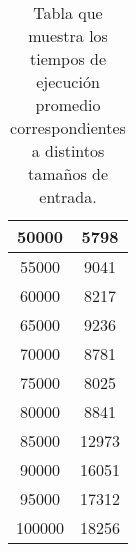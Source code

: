 \begin{table}[h!]
\begin{tabular}{cc}
\multicolumn{1}{|c|}{50000}                        & \multicolumn{1}{c|}{5798}                                                                                                                                     \\ \hline
\multicolumn{1}{|c|}{55000}                        & \multicolumn{1}{c|}{9041}                                                                                                                                     \\ \hline
\multicolumn{1}{|c|}{60000}                        & \multicolumn{1}{c|}{8217}                                                                                                                                     \\ \hline
\multicolumn{1}{|c|}{65000}                        & \multicolumn{1}{c|}{9236}                                                                                                                                     \\ \hline
\multicolumn{1}{|c|}{70000}                        & \multicolumn{1}{c|}{8781}                                                                                                                                     \\ \hline
\multicolumn{1}{|c|}{75000}                        & \multicolumn{1}{c|}{8025}                                                                                                                                     \\ \hline
\multicolumn{1}{|c|}{80000}                        & \multicolumn{1}{c|}{8841}                                                                                                                                     \\ \hline
\multicolumn{1}{|c|}{85000}                        & \multicolumn{1}{c|}{12973}                                                                                                                                     \\ \hline
\multicolumn{1}{|c|}{90000}                        & \multicolumn{1}{c|}{16051}                                                                                                                                     \\ \hline
\multicolumn{1}{|c|}{95000}                        & \multicolumn{1}{c|}{17312}                                                                                                                                     \\ \hline
\multicolumn{1}{|c|}{100000}                        & \multicolumn{1}{c|}{18256}                                                                                                                                     \\ \hline
\end{tabular}
\caption{Tabla que muestra los tiempos de ejecución promedio correspondientes a distintos tamaños de entrada.}
\end{table}

